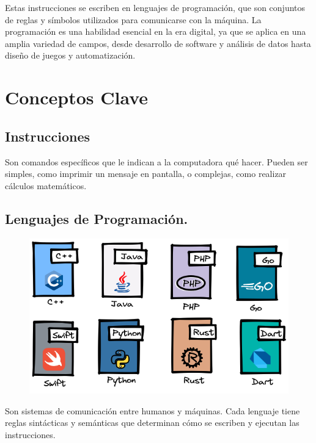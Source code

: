 \documentclass[
  a4paper,
  DIV=11,
  numbers=noendperiod,
  onepage,
  openany]{scrreprt}
\begin{document}
Estas instrucciones se escriben en lenguajes de programación, que son
conjuntos de reglas y símbolos utilizados para comunicarse con la
máquina. La programación es una habilidad esencial en la era digital, ya
que se aplica en una amplia variedad de campos, desde desarrollo de
software y análisis de datos hasta diseño de juegos y automatización.

\section{Conceptos Clave}\label{conceptos-clave}

\subsection{Instrucciones}\label{instrucciones}

Son comandos específicos que le indican a la computadora qué hacer.
Pueden ser simples, como imprimir un mensaje en pantalla, o complejas,
como realizar cálculos matemáticos.

\subsection{Lenguajes de
Programación.}\label{lenguajes-de-programaciuxf3n.}

\begin{figure}

{\centering \includegraphics{unidades/unidad1/images/lenguajes.png}

}

\end{figure}

Son sistemas de comunicación entre humanos y máquinas. Cada lenguaje
tiene reglas sintácticas y semánticas que determinan cómo se escriben y
ejecutan las instrucciones.
\end{document}
